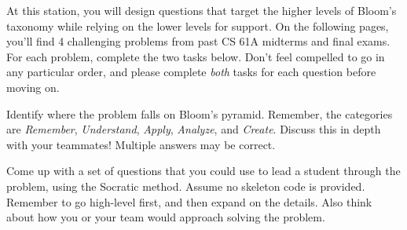 \documentclass[11pt]{article}
\begin{document}
\maketitle


\name


At this station, you will design questions that target the higher levels of Bloom's taxonomy while relying on the lower levels for support. On the following pages, you'll find 4 challenging problems from past CS 61A midterms and final exams. For each problem, complete the two tasks below. Don't feel compelled to go in any particular order, and please complete \textit{both} tasks for each question before moving on.


\begin{qlist}

Identify where the problem falls on Bloom's pyramid. Remember, the categories are \textit{Remember}, \textit{Understand}, \textit{Apply}, \textit{Analyze}, and \textit{Create}. Discuss this in depth with your teammates! Multiple answers may be correct.

Come up with a set of questions that you could use to lead a student through the problem, using the Socratic method. Assume no skeleton code is provided. Remember to go high-level first, and then expand on the details. Also think about how you or your team would approach solving the problem.

\end{qlist}

\newpage
\end{document}
